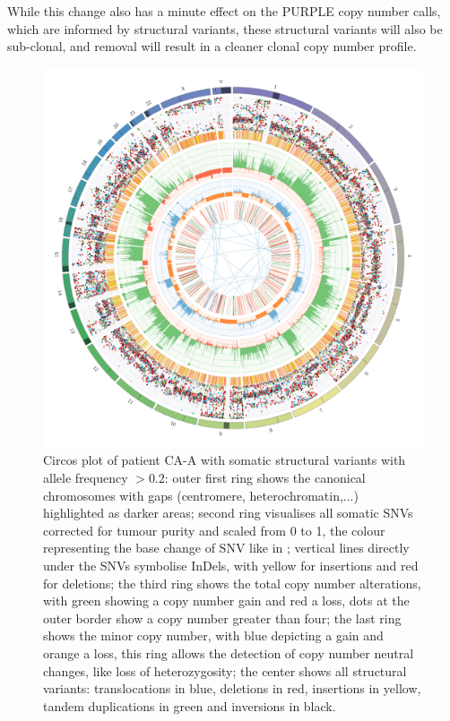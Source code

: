While this change also has a minute effect on the PURPLE copy number calls, which are informed by structural variants, these structural variants will also be sub-clonal, and  removal will result in a cleaner clonal copy number profile.


\begin{figure}[htp]
\centering
\includegraphics[width=.99\linewidth]{Figures/CASCADE/CA99/CA99-11.circos.png}
\caption[Circos plot of patient CA-A sample 11]{Circos plot of patient CA-A with somatic structural variants with allele frequency $> 0.2$: outer first ring shows the canonical chromosomes with gaps (centromere, heterochromatin,...) highlighted as darker areas; second ring visualises all somatic SNVs corrected for tumour purity and scaled from 0 to 1, the colour representing the base change of SNV like in \protect\textcite{Alexandrov2013}; vertical lines directly under the SNVs symbolise InDels, with yellow for insertions and red for deletions; the third ring shows the total copy number alterations, with green showing a copy number gain and red a loss, dots at the outer border show a copy number greater than four; the last ring shows the minor copy number, with blue depicting a gain and orange a loss, this ring allows the detection of copy number neutral changes, like loss of heterozygosity; the center shows all structural variants: translocations in blue, deletions in red, insertions in yellow, tandem duplications in green and inversions in black.} \label{fig:ca99.11circos}
\end{figure}


